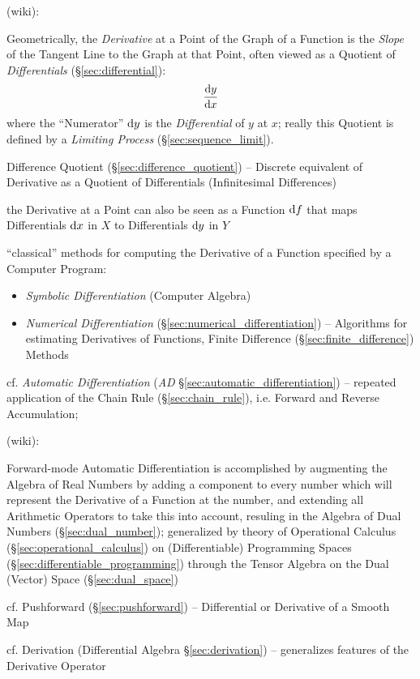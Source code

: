 (wiki):

Geometrically, the \emph{Derivative} at a Point of the Graph of a Function is
the \emph{Slope} of the Tangent Line to the Graph at that Point, often viewed as
a Quotient of \emph{Differentials} (\S\ref{sec:differential}):
\[
  \frac{\mathrm{d}y}{\mathrm{d}x}
\]
where the ``Numerator'' $\mathrm{d}y$ is the \emph{Differential} of $y$ at $x$;
really this Quotient is defined by a \emph{Limiting Process}
(\S\ref{sec:sequence_limit}). %

\fist Difference Quotient (\S\ref{sec:difference_quotient}) -- Discrete
equivalent of Derivative as a Quotient of Differentials (Infinitesimal
Differences)

the Derivative at a Point can also be seen as a Function $\mathrm{d}f$ that maps
Differentials $\mathrm{d}x$ in $X$ to Differentials $\mathrm{d}y$ in $Y$

``classical'' methods for computing the Derivative of a Function specified by a
Computer Program:
\begin{itemize}
\item \emph{Symbolic Differentiation} (Computer Algebra)
\item \emph{Numerical Differentiation} (\S\ref{sec:numerical_differentiation})
  -- Algorithms for estimating Derivatives of Functions, Finite Difference
  (\S\ref{sec:finite_difference}) Methods
\end{itemize}

\fist cf. \emph{Automatic Differentiation} (\emph{AD}
\S\ref{sec:automatic_differentiation}) -- repeated application of the Chain Rule
(\S\ref{sec:chain_rule}), i.e. Forward and Reverse Accumulation;

(wiki):

Forward-mode Automatic Differentiation is accomplished by augmenting the Algebra
of Real Numbers by adding a component to every number which will represent the
Derivative of a Function at the number, and extending all Arithmetic Operators
to take this into account, resuling in the Algebra of Dual Numbers
(\S\ref{sec:dual_number}); generalized by theory of
Operational Calculus (\S\ref{sec:operational_calculus}) on (Differentiable)
Programming Spaces (\S\ref{sec:differentiable_programming}) through the Tensor
Algebra on the Dual (Vector) Space (\S\ref{sec:dual_space})

\asterism

\fist cf. Pushforward (\S\ref{sec:pushforward}) -- Differential or Derivative of
a Smooth Map

\fist cf. Derivation (Differential Algebra \S\ref{sec:derivation}) --
generalizes features of the Derivative Operator

